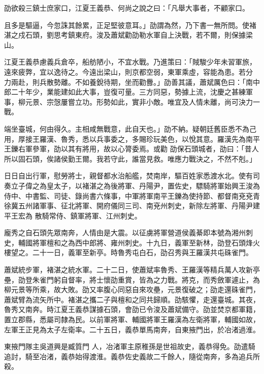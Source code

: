 \begin{pinyinscope}
 劭欲殺三鎮士庶家口，江夏王義恭、何尚之說之曰：「凡舉大事者，不顧家口。



 且多是驅逼，今忽誅其餘累，正足堅彼意耳。」劭謂為然，乃下書一無所問。使褚湛之戍石頭，劉思考鎮東府。浚及蕭斌勸劭勒水軍自上決戰，若不爾，則保據梁山。



 江夏王義恭慮義兵倉卒，船舫陋小，不宜水戰。乃進策曰：「賊駿少年未習軍旅，遠來疲弊，宜以逸待之。今遠出梁山，則京都空弱，東軍乘虛，容能為患。若分
 力兩赴，則兵散勢離。不如養銳待期，坐而勸釁。」劭善其議，蕭斌厲色曰：「南中郎二十年少，業能建如此大事，豈復可量。三方同惡，勢據上流，沈慶之甚練軍事，柳元景、宗愨屢嘗立功。形勢如此，實非小敵。唯宜及人情未離，尚可決力一戰。



 端坐臺城，何由得久。主相咸無戰意，此自天也。」劭不納。疑朝廷舊臣悉不為己用，厚接王羅漢、魯秀，悉以兵事委之，多賜珍玩美色，以悅其意。羅漢先為南平王鑠右軍參軍，劭以其有將用，故以心膂委焉。或勸
 劭保石頭城者，劭曰：「昔人所以固石頭，俟諸侯勤王爾。我若守此，誰當見救。唯應力戰決之，不然不剋。」



 日日自出行軍，慰勞將士，親督都水治船艦，焚南岸，驅百姓家悉渡水北。使有司奏立子偉之為皇太子，以褚湛之為後將軍、丹陽尹，置佐史，驃騎將軍始興王浚為侍中、中書監、司徒、錄尚書六條事，中軍將軍南平王鑠為使持節、都督南兗兗青徐冀五州諸軍事、征北將軍、開府儀同三司、南兗州刺史，新除左將軍、丹陽尹建平王宏為
 散騎常侍、鎮軍將軍、江州刺史。



 龐秀之自石頭先眾南奔，人情由是大震。以征虜將軍營道侯義綦即本號為湘州刺史，輔國將軍檀和之為西中郎將、雍州刺史。十九日，義軍至新林，劭登石頭烽火樓望之。二十一日，義軍至新亭。時魯秀屯白石，劭召秀與王羅漢共屯硃雀門。



 蕭斌統步軍，褚湛之統水軍。二十二日，使蕭斌率魯秀、王羅漢等精兵萬人攻新亭壘，劭登朱雀門躬自督率，將士懷劭重賞，皆為之力戰。將克，而秀斂軍遽止，為
 柳元景等所乘，故大敗。劭又率腹心同惡自來攻壘，元景復破之；劭走還硃雀門，蕭斌臂為流矢所中。褚湛之攜二子與檀和之同共歸順。劭駭懼，走還臺城。其夜，魯秀又南奔。時江夏王義恭謀據石頭，會劭已令浚及蕭斌備守。劭並焚京都軍籍，置立郡縣，悉屬司隸為民。以前軍將軍、輔國將軍王羅漢為左衛將軍，輔國如故，左軍王正見為太子左衛率。二十五日，義恭單馬南奔，自東掖門出，於冶渚過淮。



 東掖門隊主吳道興是臧質門
 人，冶渚軍主原稚孫是世祖故史，義恭得免。劭遣騎追討，騎至冶渚，義恭始得渡淮。義恭佐史義故二千餘人，隨從南奔，多為追兵所殺。




\end{pinyinscope}
